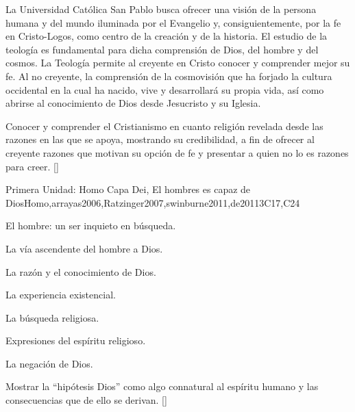 \begin{syllabus}


\begin{justification}
La Universidad Católica San Pablo busca ofrecer una visión de la persona humana y del mundo iluminada por el Evangelio y, consiguientemente, por la fe en Cristo-Logos, como centro de la creación y de la historia. El estudio de la teología es fundamental para dicha comprensión de Dios, del hombre y del cosmos.
La Teología permite al creyente en Cristo conocer y comprender mejor su fe. Al no creyente, la comprensión de la cosmovisión que ha forjado la cultura occidental en la cual ha nacido, vive y desarrollará su propia vida, así como abrirse al conocimiento de Dios desde Jesucristo y su Iglesia.
\end{justification}

\begin{goals}
\item Conocer y comprender el Cristianismo en cuanto religión revelada desde las razones en las que se apoya, mostrando su credibilidad, a fin de ofrecer al creyente razones que motivan su opción de fe y presentar a quien no lo es razones para creer. [\Familiarity]
\end{goals}



\begin{unit}{}{Primera Unidad: Homo Capa Dei, El hombres es capaz de Dios}{Homo,arrayas2006,Ratzinger2007,swinburne2011,de2011}{3}{C17,C24}
\begin{topics}
	\item El hombre: un ser inquieto en búsqueda.
	\item La vía ascendente del hombre a Dios.
	      \begin{subtopics}
		\item La razón y el conocimiento de Dios.
		\item La experiencia existencial.
		\item La búsqueda religiosa.
	      \end{subtopics}
	\item Expresiones del espíritu religioso.
	\item La negación de Dios.
\end{topics}
\begin{learningoutcomes}
	\item Mostrar la ``hipótesis Dios'' como algo connatural al espíritu humano y las consecuencias que de ello se derivan. [\Familiarity]
\end{learningoutcomes}
\end{unit}


\end{syllabus}

